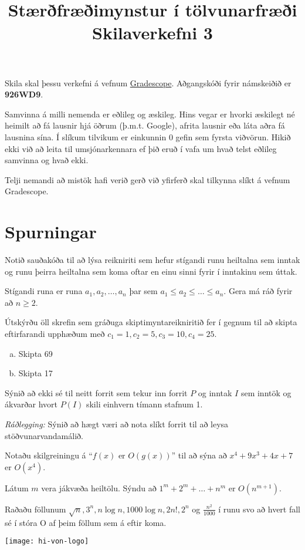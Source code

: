 \documentclass{exam}
\title{Stærðfræðimynstur í tölvunarfræði \\ Skilaverkefni 3}
\author{}
\begin{document}
\maketitle
\thispagestyle{empty} 

Skila skal þessu verkefni á vefnum \href{https://gradescope.com/}{Gradescope}. Aðgangskóði fyrir námskeiðið er \textbf{926WD9}.

Samvinna á milli nemenda er eðlileg og æskileg. Hins vegar er hvorki æskilegt né heimilt að fá lausnir hjá öðrum (þ.m.t. Google), afrita lausnir eða láta aðra fá lausnina sína. Í slíkum tilvikum er einkunnin 0 gefin sem fyrsta viðvörun. Hikið ekki við að leita til umsjónarkennara ef þið eruð í vafa um hvað telst eðlileg samvinna og hvað ekki.

Telji nemandi að mistök hafi verið gerð við yfirferð skal tilkynna slíkt á vefnum Gradescope.

\section{Spurningar}
\begin{questions}
\question Notið sauðakóða til að lýsa reikniriti sem hefur stígandi runu heiltalna sem inntak og runu þeirra heiltalna sem koma oftar en einu sinni fyrir í inntakinu sem úttak.

Stígandi runa er runa $a_1, a_2, \ldots, a_n$ þar sem $a_1 \leq a_2 \leq \ldots \leq a_n$. Gera má ráð fyrir að $n \geq 2$.

\question Útskýrðu öll skrefin sem gráðuga skiptimyntareikniritið fer í gegnum til að skipta eftirfarandi upphæðum með $c_1 = 1, c_2 = 5, c_3 = 10, c_4 = 25$.
\begin{enumerate}[a)]
 \item Skipta 69
 \item Skipta 17
\end{enumerate}

\question Sýnið að ekki sé til neitt forrit sem tekur inn forrit $P$ og inntak $I$ sem inntök og ákvarðar hvort $P(I)$ skili einhvern tímann stafnum 1.

\emph{Ráðlegging:} Sýnið að hægt væri að nota slíkt forrit til að leysa stöðvunarvandamálið.

\question Notaðu skilgreiningu á ``$f(x)$ er $O(g(x))$'' til að sýna að $x^4 + 9x^3 + 4x + 7$ er $O(x^4)$.

\question Látum $m$ vera jákvæða heiltölu. Sýndu að $1^m + 2^m + \ldots + n^m$ er $O(n^{m+1})$.

\question Raðaðu föllunum $\sqrt{n}, 3^n, n \log n, 1000 \log n,  2n!, 2^n$ og $\frac{n^2}{1000}$ í runu svo að hvert fall sé í stóra O af þeim föllum sem á eftir koma.

\end{questions}

\vfill
\texttt{[image: hi-von-logo]}
\end{document}
